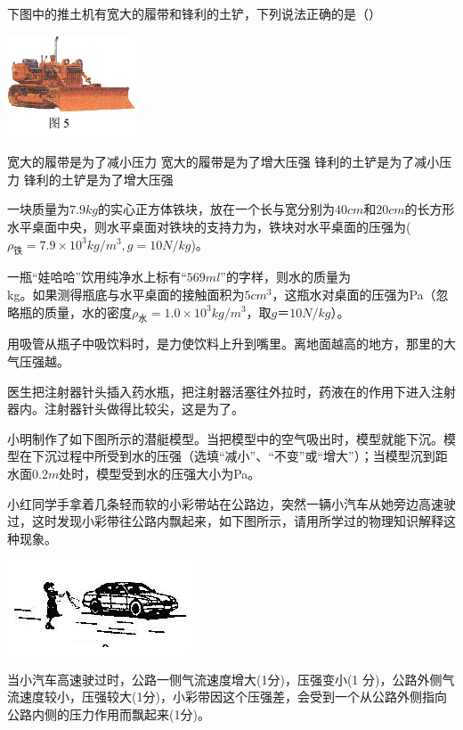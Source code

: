 \documentclass[12pt]{exam}%
\begin{document}
\begin{Aquestions}
\begin{questions}
\question
下图中的推土机有宽大的履带和锋利的土铲，下列说法正确的是（\answerline*[D]）
\begin{multicols}{2}
\includegraphics[scale=1]{figures/图片+5.png} 
\columnbreak
\begin{choices}
\choice 宽大的履带是为了减小压力
\choice 宽大的履带是为了增大压强
\choice 锋利的土铲是为了减小压力
\choice 锋利的土铲是为了增大压强
\end{choices}
\end{multicols}


\question
一块质量为$7.9kg$的实心正方体铁块，放在一个长与宽分别为$40cm$和$20cm$的长方形水平桌面中央，则水平桌面对铁块的支持力为\answerline*[79N]，铁块对水平桌面的压强为\answerline*[7900Pa]($\rho _\textrm{铁}=7.9 \times 10^3 kg/m^3 , g=10N/kg$)。

\question
一瓶“娃哈哈”饮用纯净水上标有“$569ml$”的字样，则水的质量为\\ \answerline*[0.569]kg。如果测得瓶底与水平桌面的接触面积为$5cm^3$，这瓶水对桌面的压强为Pa（忽略瓶的质量，水的密度$\rho _\textrm{水}=1.0 \times 10^3 kg/m^3$，取$g＝10N/kg$）。


\question
用吸管从瓶子中吸饮料时，是\answerline*[大气压]力使饮料上升到嘴里。离地面越高的地方，那里的大气压强越\answerline*[小]。


\question
医生把注射器针头插入药水瓶，把注射器活塞往外拉时，药液在\answerline*[大气压]的作用下进入注射器内。注射器针头做得比较尖，这是为了\answerline*[增大压强]。


\question
小明制作了如下图所示的潜艇模型。当把模型中的空气吸出时，模型就能下沉。模型在下沉过程中所受到水的压强\answerline*[增大]（选填“减小”、“不变”或“增大”）；当模型沉到距水面$0.2m$处时，模型受到水的压强大小为\answerline*[2000]Pa。


\question
小红同学手拿着几条轻而软的小彩带站在公路边，突然一辆小汽车从她旁边高速驶过，这时发现小彩带往公路内飘起来，如下图所示，请用所学过的物理知识解释这种现象。
\begin{multicols}{2}
\includegraphics[scale=1]{figures/图片+11.png} 
\columnbreak
\begin{solution}[16ex]
当小汽车高速驶过时，公路一侧气流速度增大(1分)，压强变小(1 分)，公路外侧气流速度较小，压强较大(1分)，小彩带因这个压强差，会受到一个从公路外侧指向公路内侧的压力作用而飘起来(1分)。
\end{solution}
\end{multicols}



\end{questions}
\end{Aquestions}
\end{document}

